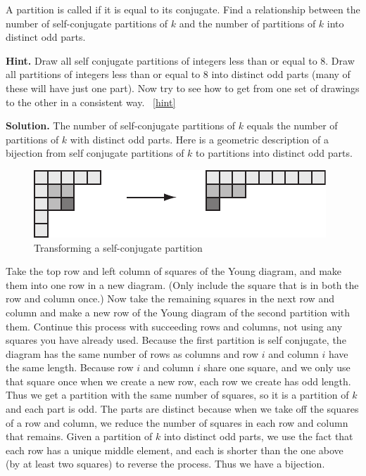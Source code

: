 \documentclass{book}
\begin{document}
\setcounter{project}{305}
\addtocounter{project}{-1}
\begin{activity}[]\label{activity-298}
\hypertarget{p-1522}{}%
A partition is called  if it is equal to its conjugate. Find a relationship between the number of self-conjugate partitions of \(k\) and the number of partitions of \(k\) into distinct odd parts.%
\par\smallskip%
\noindent\textbf{Hint.}\hypertarget{hint-191}{}\quad%
\hypertarget{p-1523}{}%
Draw all self conjugate partitions of integers less than or equal to 8.  Draw all partitions of integers less than or equal to 8 into distinct odd parts (many of these will have just one part). Now try to see how to get from one set of drawings to the other in a consistent way.%
~\hfill{\tiny\hyperlink{a-305}{[hint]}\hypertarget{q-305}{}}\par\smallskip%
\noindent\textbf{Solution.}\hypertarget{solution-193}{}\quad%
\hypertarget{p-1524}{}%
The number of self-conjugate partitions of \(k\) equals the number of partitions of \(k\) with distinct odd parts. Here is a geometric description of a bijection from self conjugate partitions of \(k\) to partitions into distinct odd parts.%
\begin{figure}
\centering
\includegraphics[width=0.6\linewidth]{images/selfconjugate}
\caption{Transforming a self-conjugate partition\label{selfconjugate-to-distinctodd}}
\end{figure}
\hypertarget{p-1525}{}%
Take the top row and left column of squares of the Young diagram, and make them into one row in a new diagram. (Only include the square that is in both the row and column once.) Now take the remaining squares in the next row and column and make a new row of the Young diagram of the second partition with them. Continue this process with succeeding rows and columns, not using any squares you have already used. Because the first partition is self conjugate, the diagram has the same number of rows as columns and row \(i\) and column \(i\) have the same length. Because row \(i\) and column \(i\) share one square, and we only use that square once when we create a new row, each row we create has odd length. Thus we get a partition with the same number of squares, so it is a partition of \(k\) and each part is odd. The parts are distinct because when we take off the squares of a row and column, we reduce the number of squares in each row and column that remains. Given a partition of \(k\) into distinct odd parts, we use the fact that each row has a unique middle element, and each is shorter than the one above (by at least two squares) to reverse the process. Thus we have a bijection.%
\end{activity}

\clearpage
\end{document}
